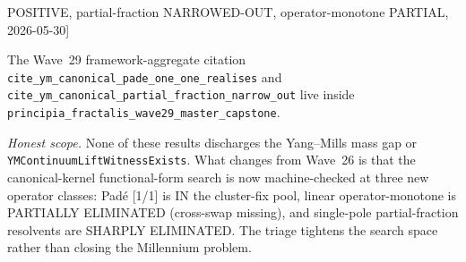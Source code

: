 \begin{remark}[Wave~29--32 YM canonical-kernel triage: Padé [1/1] POSITIVE, partial-fraction NARROWED-OUT, operator-monotone PARTIAL, 2026-05-30]
\begin{itemize}
\end{itemize}
The Wave~29 framework-aggregate citation \texttt{cite\_ym\_canonical\_pade\_one\_one\_realises} and \texttt{cite\_ym\_canonical\_partial\_fraction\_narrow\_out} live inside \texttt{principia\_fractalis\_wave29\_master\_capstone}.

\emph{Honest scope.} None of these results discharges the Yang--Mills mass gap or \texttt{YMContinuumLiftWitnessExists}. What changes from Wave~26 is that the canonical-kernel functional-form search is now machine-checked at three new operator classes: Padé [1/1] is IN the cluster-fix pool, linear operator-monotone is PARTIALLY ELIMINATED (cross-swap missing), and single-pole partial-fraction resolvents are SHARPLY ELIMINATED. The triage tightens the search space rather than closing the Millennium problem.
\end{remark}

